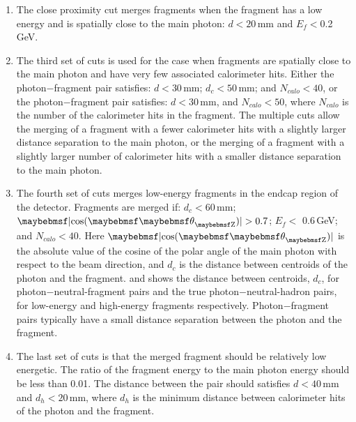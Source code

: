 \begin{enumerate}

  \item The close proximity cut merges fragments  when the fragment has a low energy and is spatially close to the main photon: $d < 20 $\,mm and  $E_f<$0.2\,GeV.
  \item The third set of cuts is used for the case when fragments are spatially close to the main photon and have very few associated calorimeter hits. Either the  photon$-$fragment pair satisfies:  $d < 30 $\,mm; $d_c < 50 $\,mm; and $N_{calo}<40$, or the  photon$-$fragment pair satisfies: $d < 30 $\,mm, and $N_{calo}<50$, where $N_{calo}$ is the number of the calorimeter  hits  in the fragment. The multiple cuts allow the merging of a fragment with a fewer  calorimeter hits with a slightly larger distance separation to the main photon, or the merging of a fragment with a slightly larger number of  calorimeter hits with a smaller distance separation to the main photon.

  \item The fourth set of  cuts merges low-energy fragments in the  endcap region of the detector. Fragments are merged if: $d_c < 60$\,mm; $\absCosTheta > 0.7$; $E_f<$ 0.6\,GeV; and $N_{calo}<40$. Here $\absCosTheta$ is the absolute value of the cosine of the polar angle of the main photon with respect to the beam direction, and $d_c$ is the distance between centroids of the photon and the fragment.  and  shows the distance between centroids, $d_c$,  for photon$-$neutral-fragment pairs and the true photon$-$neutral-hadron pairs, for low-energy and high-energy fragments respectively. Photon$-$fragment pairs typically have a small distance separation between the photon and the fragment.

  \item The last set of  cuts is that the merged fragment should be relatively low energetic. The ratio of the fragment energy  to the main photon energy should be less than 0.01. The distance between the pair should satisfies $d < 40$\,mm and $d_h < 20$\,mm, where  $d_h$ is the minimum distance between calorimeter hits of the photon and the fragment.
\end{enumerate}




